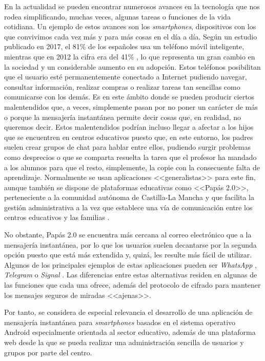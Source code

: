 \documentclass{pre-tfg}
\begin{document}
En la actualidad se pueden encontrar numerosos avances en la tecnología que nos rodea simplificando, muchas veces, algunas tareas o funciones de la vida cotidiana. Un ejemplo de estos avances son los \textit{smartphones}, dispositivos con los que convivimos cada vez más y para más cosas en el día a día. Según un estudio publicado en 2017, el 81\% de los españoles usa un teléfono móvil inteligente, mientras que en 2012 la cifra era del 41\% \cite{Justo2017}, lo que representa un gran cambio en la sociedad y un considerable aumento en su adopción. Estos teléfonos posibilitan que el usuario esté permanentemente conectado a Internet pudiendo navegar, consultar información, realizar compras o realizar tareas tan sencillas como comunicarse con los demás. Es en este ámbito donde se pueden producir ciertos malentendidos que, a veces, simplemente pasan por no poner un carácter de más o porque la mensajería instantánea permite decir cosas que, en realidad, no queremos decir. Estos malentendidos podrían incluso llegar a afectar a los hijos que se encuentren en centros educativos puesto que, en este entorno, los padres suelen crear grupos de chat para hablar entre ellos, pudiendo surgir problemas como desprecios o que se comparta resuelta la tarea que el profesor ha mandado a los alumnos para que el resto, simplemente, la copie con la consecuente falta de aprendizaje. Normalmente se usan aplicaciones <<generalistas>> para este fin, aunque también se dispone de plataformas educativas como <<Papás 2.0>>, perteneciente a la comunidad autónoma de Castilla-La Mancha y que facilita la gestión administrativa a la vez que establece una vía de comunicación entre los centros educativos y las familias \cite{JCCM2017}.

No obstante, Papás 2.0 se encuentra más cercana al correo electrónico que a la mensajería instantánea, por lo que los usuarios suelen decantarse por la segunda opción puesto que está más extendida y, quizá, les resulte más fácil de utilizar. Algunos de los principales ejemplos de estas aplicaciones pueden ser \textit{WhatsApp} \cite{WhatsApp}, \textit{Telegram} \cite{Telegram2017} o \textit{Signal} \cite{Signal}. Las diferencias entre estas alternativas residen en algunas de las funciones que cada una ofrece, además del protocolo de cifrado para mantener los mensajes seguros de miradas <<ajenas>>.

Por tanto, se considera de especial relevancia el desarrollo de una aplicación de mensajería instantánea para \textit{smartphones} basados en el sistema operativo Android especialmente orientada al sector educativo, además de una plataforma web desde la que se pueda realizar una administración sencilla de usuarios y grupos por parte del centro.
\end{document}
